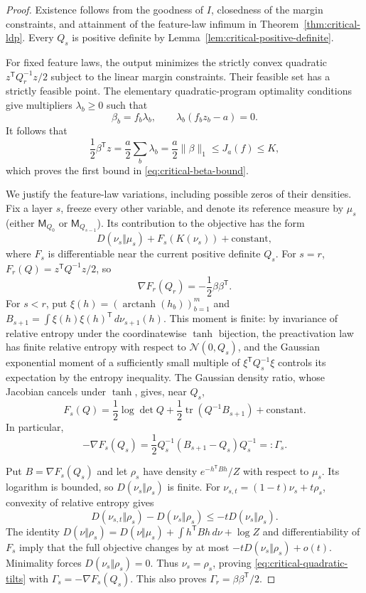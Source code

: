 \begin{proof}
Existence follows from the goodness of $I$, closedness of the margin
constraints, and attainment of the feature-law infimum in
Theorem~\ref{thm:critical-ldp}. Every $Q_s$ is positive definite by
Lemma~\ref{lem:critical-positive-definite}.

For fixed feature laws, the output minimizes the strictly convex quadratic
$z^{\mathsf T}Q_r^{-1}z/2$ subject to the linear margin constraints.
Their feasible set has a strictly feasible point. The elementary
quadratic-program optimality conditions give multipliers $\lambda_b\geq0$
such that
\[
 \beta_b=f_b\lambda_b,\qquad
 \lambda_b(f_bz_b-a)=0.
\]
It follows that
\[
 \frac12\beta^{\mathsf T}z
 =\frac a2\sum_b\lambda_b
 =\frac a2\|\beta\|_1\leq J_a(f)\leq K,
\]
which proves the first bound in \eqref{eq:critical-beta-bound}.

We justify the feature-law variations, including possible zeros of their
densities. Fix a layer $s$, freeze every other variable, and denote its
reference measure by $\mu_s$ (either $\mathsf M_{Q_0}$ or
$\mathsf M_{Q_{s-1}}$). Its contribution to the objective has the form
\[
 D(\nu_s\Vert\mu_s)+F_s(K(\nu_s))+\text{constant},
\]
where $F_s$ is differentiable near the current positive definite $Q_s$.
For $s=r$, $F_r(Q)=z^{\mathsf T}Q^{-1}z/2$, so
\[
 \nabla F_r(Q_r)=-\frac12\beta\beta^{\mathsf T}.
\]
For $s<r$, put $\xi(h)=(\operatorname{arctanh}(h_b))_{b=1}^m$ and
$B_{s+1}=\int\xi(h)\xi(h)^{\mathsf T}\,d\nu_{s+1}(h)$.
This moment is finite: by invariance of relative entropy under the
coordinatewise $\tanh$ bijection, the preactivation law has finite
relative entropy with respect to $\mathcal N(0,Q_s)$, and the Gaussian
exponential moment of a sufficiently small multiple of
$\xi^{\mathsf T}Q_s^{-1}\xi$ controls its expectation by the entropy
inequality. The Gaussian density ratio, whose Jacobian cancels under
$\tanh$, gives, near $Q_s$,
\[
 F_s(Q)=\frac12\log\det Q+\frac12\operatorname{tr}(Q^{-1}B_{s+1})
       +\text{constant}.
\]
In particular,
\begin{equation}\label{eq:critical-Gamma-from-moments}
 -\nabla F_s(Q_s)
 =\frac12Q_s^{-1}(B_{s+1}-Q_s)Q_s^{-1}=:\Gamma_s.
\end{equation}

Put $B=\nabla F_s(Q_s)$ and let $\rho_s$ have density
$e^{-h^{\mathsf T}Bh}/Z$ with respect to $\mu_s$. Its logarithm is bounded,
so $D(\nu_s\Vert\rho_s)$ is finite. For
$\nu_{s,t}=(1-t)\nu_s+t\rho_s$, convexity of relative entropy gives
\[
 D(\nu_{s,t}\Vert\rho_s)-D(\nu_s\Vert\rho_s)
 \leq-tD(\nu_s\Vert\rho_s).
\]
The identity
$D(\nu\Vert\rho_s)=D(\nu\Vert\mu_s)+\int h^{\mathsf T}Bh\,d\nu+\log Z$
and differentiability of $F_s$ imply that the full objective changes by
at most $-tD(\nu_s\Vert\rho_s)+o(t)$. Minimality forces
$D(\nu_s\Vert\rho_s)=0$. Thus $\nu_s=\rho_s$, proving
\eqref{eq:critical-quadratic-tilts} with
$\Gamma_s=-\nabla F_s(Q_s)$. This also proves
$\Gamma_r=\beta\beta^{\mathsf T}/2$.


\end{proof}
